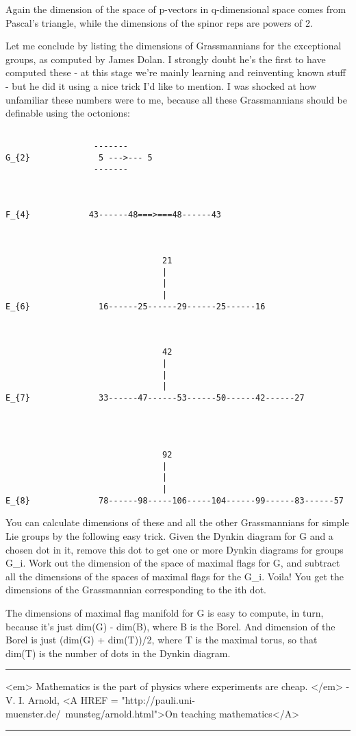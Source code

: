 Again the dimension of the space of p-vectors in q-dimensional space
comes from Pascal's triangle, while the dimensions of the spinor reps 
are powers of 2.

Let me conclude by listing the dimensions of Grassmannians for the
exceptional groups, as computed by James Dolan.  I strongly doubt he's
the first to have computed these - at this stage we're mainly learning
and reinventing known stuff - but he did it using a nice trick I'd like
to mention.  I was shocked at how unfamiliar these numbers were to me,
because all these Grassmannians should be definable using the octonions:



\begin{verbatim}

                  -------
G_{2}              5 --->--- 5
                  -------



F_{4}            43------48===>===48------43



                                21
                                |
                                |
                                |
E_{6}              16------25------29------25------16



                                42
                                |
                                |
                                |
E_{7}              33------47------53------50------42------27




                                92
                                |
                                |
                                |
E_{8}              78------98-----106-----104------99------83------57

\end{verbatim}
    
You can calculate dimensions of these and all the other Grassmannians
for simple Lie groups by the following easy trick.  Given the Dynkin
diagram for G and a chosen dot in it, remove this dot to get one or more
Dynkin diagrams for groups G_{i}.  Work out the dimension of the space
of maximal flags for G, and subtract all the dimensions of the spaces
of maximal flags for the G_{i}.  Voila!  You get the dimensions of the
Grassmannian corresponding to the ith dot.

The dimensions of maximal flag manifold for G is easy to compute, in
turn, because it's just dim(G) - dim(B), where B is the Borel.  And
dimension of the Borel is just (dim(G) + dim(T))/2, where T is the
maximal torus, so that dim(T) is the number of dots in the Dynkin diagram.





 \par\noindent\rule{\textwidth}{0.4pt}
<em> Mathematics is the part of physics
where experiments are cheap. </em> - V. I. Arnold, <A HREF = "http://pauli.uni-muenster.de/~munsteg/arnold.html">On teaching mathematics</A>

\par\noindent\rule{\textwidth}{0.4pt}

